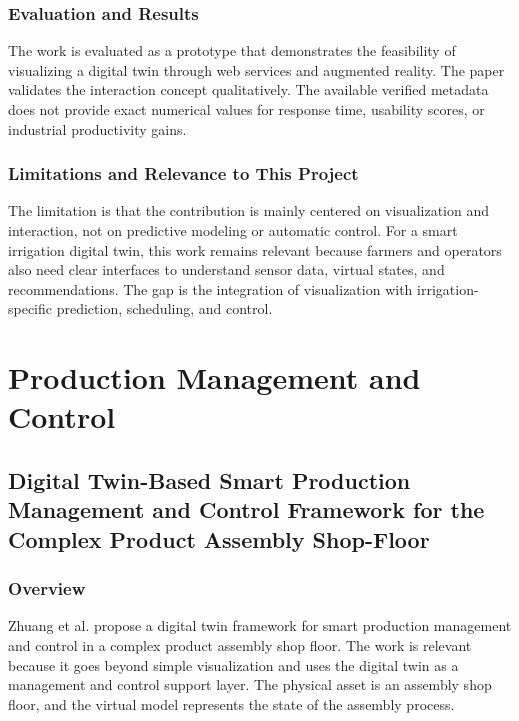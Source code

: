 \subsubsection{Evaluation and Results}

The work is evaluated as a prototype that demonstrates the feasibility of visualizing a digital twin through web services and augmented reality. The paper validates the interaction concept qualitatively. The available verified metadata does not provide exact numerical values for response time, usability scores, or industrial productivity gains.

\subsubsection{Limitations and Relevance to This Project}

The limitation is that the contribution is mainly centered on visualization and interaction, not on predictive modeling or automatic control. For a smart irrigation digital twin, this work remains relevant because farmers and operators also need clear interfaces to understand sensor data, virtual states, and recommendations. The gap is the integration of visualization with irrigation-specific prediction, scheduling, and control.

\section{Production Management and Control}

\subsection[Digital Twin-Based Smart Production Management and Control Framework for the Complex Product Assembly Shop-Floor]{Digital Twin-Based Smart Production Management and Control Framework for the Complex Product Assembly Shop-Floor \cite{zhuang2018digitalTwinAssembly}}

\subsubsection{Overview}

Zhuang et al. propose a digital twin framework for smart production management and control in a complex product assembly shop floor. The work is relevant because it goes beyond simple visualization and uses the digital twin as a management and control support layer. The physical asset is an assembly shop floor, and the virtual model represents the state of the assembly process.

